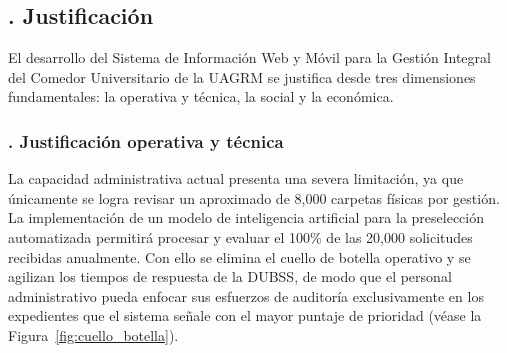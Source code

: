 \subsection{. Justificación}\label{sec:justificacion}

El desarrollo del Sistema de Información Web y Móvil para la Gestión Integral del Comedor Universitario de la UAGRM se justifica desde tres dimensiones fundamentales: la operativa y técnica, la social y la económica.

\subsubsection{. Justificación operativa y técnica}\label{sec:justificacion_operativa_tecnica}

La capacidad administrativa actual presenta una severa limitación, ya que únicamente se logra revisar un aproximado de 8,000 carpetas físicas por gestión. La implementación de un modelo de inteligencia artificial para la preselección automatizada permitirá procesar y evaluar el 100\% de las 20,000 solicitudes recibidas anualmente. Con ello se elimina el cuello de botella operativo y se agilizan los tiempos de respuesta de la DUBSS, de modo que el personal administrativo pueda enfocar sus esfuerzos de auditoría exclusivamente en los expedientes que el sistema señale con el mayor puntaje de prioridad (véase la Figura~\ref{fig:cuello_botella}).

